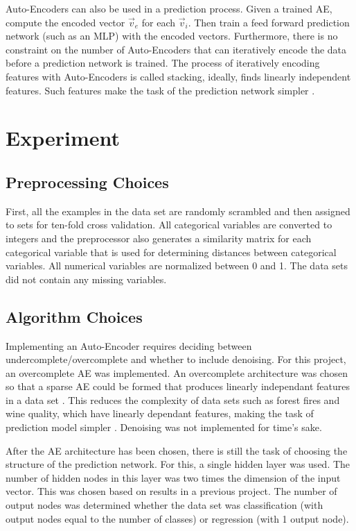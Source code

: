 \documentclass[twoside,11pt]{article}
\begin{document}
	Auto-Encoders can also be used in a prediction process. Given a trained AE, compute the encoded vector  $\vec{v}_e$ for each $\vec{v}_i$. 
	Then train a feed forward prediction network (such as an MLP) with the encoded vectors. 
	Furthermore, there is no constraint on the number of Auto-Encoders that can iteratively encode the data before a prediction network is trained. 
	The process of iteratively encoding features with Auto-Encoders is called stacking, ideally, finds linearly independent features. Such features make the task of the prediction network simpler \citep{sparsity}.
		
\section{Experiment}

\subsection{Preprocessing Choices}

	First, all the examples in the data set are randomly scrambled and then assigned to sets for ten-fold cross validation. 
	All categorical variables are converted to integers 
	and the preprocessor also generates a similarity matrix for each categorical variable that is used for determining distances between categorical variables. 
	All numerical variables are normalized between 0 and 1. 
	The data sets did not contain any missing variables.

\subsection{Algorithm Choices}
	
	Implementing an Auto-Encoder requires deciding between undercomplete/overcomplete and whether to include denoising.
	For this project, an overcomplete AE was implemented. An overcomplete architecture was chosen so that a sparse AE could be formed that produces linearly independant features in a data set \citep{sparsity}. 
	This reduces the complexity of data sets such as forest fires and wine quality, which have linearly dependant features, making the task of prediction model simpler \citep{datasets}.
	Denoising was not implemented for time's sake.
	
	After the AE architecture has been chosen, there is still the task of choosing the structure of the prediction network.
	For this, a single hidden layer was used. 
	The number of hidden nodes in this layer was two times the dimension of the input vector. This was chosen based on results in a previous project. 
	The number of output nodes was determined whether the data set was classification (with output nodes equal to the number of classes) or regression (with 1 output node).
\end{document}

